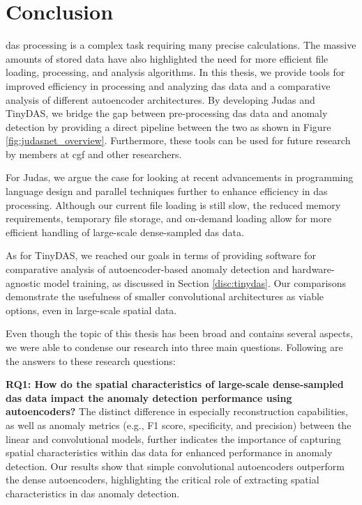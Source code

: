 \section{Conclusion}
\label{conc:conc}

\acrshort{das} processing is a complex task requiring many precise calculations. The massive amounts of stored data have also highlighted the need for more efficient file loading, processing, and analysis algorithms. In this thesis, we provide tools for improved efficiency in processing and analyzing \acrshort{das} data and a comparative analysis of different autoencoder architectures. By developing
Judas and TinyDAS, we bridge the gap between pre-processing \acrshort{das} data and anomaly detection by providing a direct pipeline between the two as shown in Figure \ref{fig:judasnet_overview}. Furthermore, these tools can be used for future research by members at \acrshort{cgf} and other researchers.

For Judas, we argue the case for looking at recent advancements in programming language design and parallel techniques further to enhance efficiency in \acrshort{das} processing. Although our current file loading is still slow, the reduced memory requirements, temporary file storage, and on-demand loading allow for more efficient handling of large-scale dense-sampled \acrshort{das} data.

As for TinyDAS, we reached our goals in terms of providing software for comparative analysis of autoencoder-based anomaly detection and hardware-agnostic model training, as discussed in Section \ref{disc:tinydas}. Our comparisons demonstrate the usefulness of smaller convolutional architectures as viable options, even in large-scale spatial data.

Even though the topic of this thesis has been broad and contains several aspects, we were able to condense our research into three main questions. Following are the answers to these research questions:

\textbf{RQ1: How do the spatial characteristics of large-scale dense-sampled \acrshort{das} data impact the anomaly detection performance using autoencoders?}
The distinct difference in especially reconstruction capabilities, as well as anomaly metrics (e.g., F1 score, specificity, and precision) between the linear and convolutional models, further indicates the importance of capturing spatial characteristics within \acrshort{das} data for enhanced performance in anomaly detection. Our results show that simple convolutional autoencoders outperform the dense autoencoders, highlighting the critical role of extracting spatial characteristics in \acrshort{das} anomaly detection.


